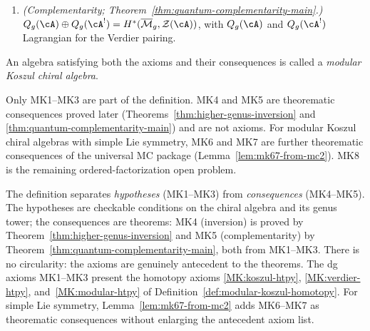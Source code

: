 \begin{definition}
\begin{enumerate}[label=\textup{(MK\arabic*)},start=4]
\item\label{MK:complementarity}
\emph{(Complementarity; Theorem~\textup{\ref{thm:quantum-complementarity-main}}.)}
$Q_g(\cA) \oplus Q_g(\cA^!) = H^*(\overline{\mathcal{M}}_g, \mathcal{Z}(\cA))$,
with $Q_g(\cA)$ and $Q_g(\cA^!)$ Lagrangian for the Verdier pairing.
\end{enumerate}

An algebra satisfying both the axioms and their consequences is called a
\emph{modular Koszul chiral algebra}.
\end{definition}

\begin{remark}\label{rem:mk-axioms-vs-consequences}
Only MK1--MK3 are part of the definition. MK4 and MK5 are theorematic
consequences proved later (Theorems~\ref{thm:higher-genus-inversion} and
\ref{thm:quantum-complementarity-main}) and are not axioms.  For
modular Koszul chiral algebras with simple Lie symmetry, MK6 and MK7
are further theorematic consequences of the universal MC package
(Lemma~\ref{lem:mk67-from-mc2}).  MK8 is the remaining
ordered-factorization open problem.
\end{remark}

\begin{remark}\label{rem:mk-axiom-relations}
The definition separates \emph{hypotheses} (MK1--MK3) from
\emph{consequences} (MK4--MK5).  The hypotheses are
checkable conditions on the chiral algebra and its genus tower;
the consequences are theorems: MK4 (inversion) is proved by Theorem~\ref{thm:higher-genus-inversion} and MK5 (complementarity) by Theorem~\ref{thm:quantum-complementarity-main}, both from MK1--MK3.
There is no circularity: the axioms are genuinely antecedent
to the theorems.  The dg axioms MK1--MK3 present the homotopy axioms
\ref{MK:koszul-htpy}, \ref{MK:verdier-htpy},
and~\ref{MK:modular-htpy} of
Definition~\ref{def:modular-koszul-homotopy}.  For simple Lie
symmetry, Lemma~\ref{lem:mk67-from-mc2} adds MK6--MK7 as theorematic
consequences without enlarging the antecedent axiom list.
\end{remark}

